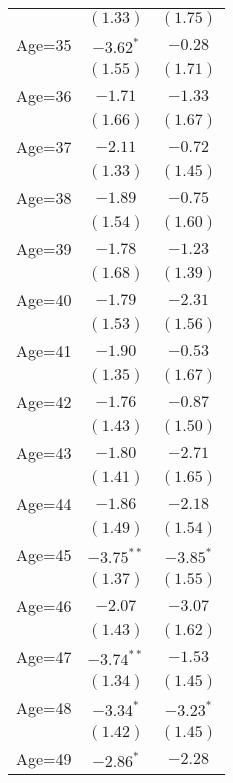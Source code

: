 \documentclass[fullpage]{paper}
\begin{document}
\begin{center}
\begin{longtable}{l c c }
            & $(1.33)$      & $(1.75)$      \\
Age=35      & $-3.62^{*}$   & $-0.28$       \\
            & $(1.55)$      & $(1.71)$      \\
Age=36      & $-1.71$       & $-1.33$       \\
            & $(1.66)$      & $(1.67)$      \\
Age=37      & $-2.11$       & $-0.72$       \\
            & $(1.33)$      & $(1.45)$      \\
Age=38      & $-1.89$       & $-0.75$       \\
            & $(1.54)$      & $(1.60)$      \\
Age=39      & $-1.78$       & $-1.23$       \\
            & $(1.68)$      & $(1.39)$      \\
Age=40      & $-1.79$       & $-2.31$       \\
            & $(1.53)$      & $(1.56)$      \\
Age=41      & $-1.90$       & $-0.53$       \\
            & $(1.35)$      & $(1.67)$      \\
Age=42      & $-1.76$       & $-0.87$       \\
            & $(1.43)$      & $(1.50)$      \\
Age=43      & $-1.80$       & $-2.71$       \\
            & $(1.41)$      & $(1.65)$      \\
Age=44      & $-1.86$       & $-2.18$       \\
            & $(1.49)$      & $(1.54)$      \\
Age=45      & $-3.75^{**}$  & $-3.85^{*}$   \\
            & $(1.37)$      & $(1.55)$      \\
Age=46      & $-2.07$       & $-3.07$       \\
            & $(1.43)$      & $(1.62)$      \\
Age=47      & $-3.74^{**}$  & $-1.53$       \\
            & $(1.34)$      & $(1.45)$      \\
Age=48      & $-3.34^{*}$   & $-3.23^{*}$   \\
            & $(1.42)$      & $(1.45)$      \\
Age=49      & $-2.86^{*}$   & $-2.28$       \\

\end{longtable}
\end{center}
\end{document}
